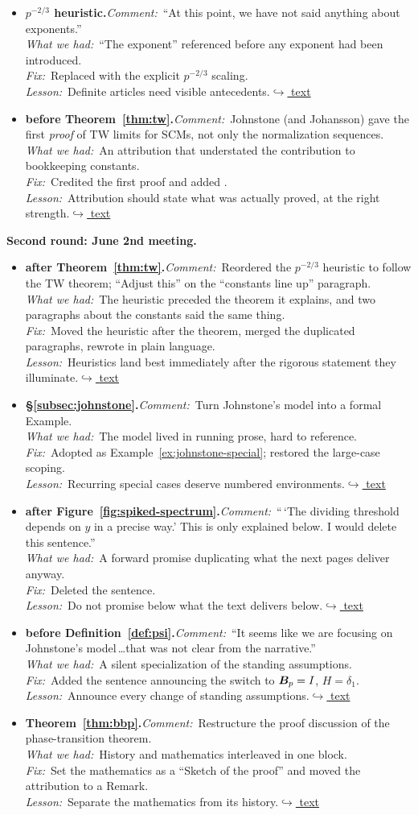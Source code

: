 \documentclass[12pt]{article}
\newcommand{\gdlogentry}[6]{%
  \item[\textcolor{thesisRev}{$\star$\,\ref{gdrev:#1}}]\hypertarget{gdlog:#1}{}%
  \textbf{#2.}\enspace\emph{Comment:}~#3\\
  \emph{What we had:}~#4\\
  \emph{Fix:}~#5\\
  \emph{Lesson:}~#6\enspace\hyperlink{gdtext:#1}{\textcolor{thesisLink}{$\hookrightarrow$ text}}}
\begin{document}
\begin{itemize}[leftmargin=2.4em,itemsep=0.55em]
\gdlogentry{exponent}{\(p^{-2/3}\) heuristic}{``At this point, we have not said anything about exponents.''}{``The exponent'' referenced before any exponent had been introduced.}{Replaced with the explicit \(p^{-2/3}\) scaling.}{Definite articles need visible antecedents.}

\gdlogentry{johnstone-attr}{before Theorem~\ref{thm:tw}}{Johnstone (and Johansson) gave the first \emph{proof} of TW limits for SCMs, not only the normalization sequences.}{An attribution that understated the contribution to bookkeeping constants.}{Credited the first proof and added \citet{Johansson2000}.}{Attribution should state what was actually proved, at the right strength.}
\end{itemize}

\medskip
\noindent\textbf{Second round: June 2nd meeting.}
\begin{itemize}[leftmargin=2.4em,itemsep=0.55em]
\gdlogentry{heuristic-reorder}{after Theorem~\ref{thm:tw}}{Reordered the \(p^{-2/3}\) heuristic to follow the TW theorem; ``Adjust this'' on the ``constants line up'' paragraph.}{The heuristic preceded the theorem it explains, and two paragraphs about the constants said the same thing.}{Moved the heuristic after the theorem, merged the duplicated paragraphs, rewrote in plain language.}{Heuristics land best immediately after the rigorous statement they illuminate.}

\gdlogentry{johnstone-example}{\S\ref{subsec:johnstone}}{Turn Johnstone's model into a formal Example.}{The model lived in running prose, hard to reference.}{Adopted as Example~\ref{ex:johnstone-special}; restored the large-case scoping.}{Recurring special cases deserve numbered environments.}

\gdlogentry{delete-threshold}{after Figure~\ref{fig:spiked-spectrum}}{``\,`The dividing threshold depends on \(y\) in a precise way.' This is only explained below. I would delete this sentence.''}{A forward promise duplicating what the next pages deliver anyway.}{Deleted the sentence.}{Do not promise below what the text delivers below.}

\gdlogentry{johnstone-focus}{before Definition~\ref{def:psi}}{``It seems like we are focusing on Johnstone's model\,\dots that was not clear from the narrative.''}{A silent specialization of the standing assumptions.}{Added the sentence announcing the switch to \(\bm{B}_p = I\), \(H = \delta_1\).}{Announce every change of standing assumptions.}

\gdlogentry{proof-sketch}{Theorem~\ref{thm:bbp}}{Restructure the proof discussion of the phase-transition theorem.}{History and mathematics interleaved in one block.}{Set the mathematics as a ``Sketch of the proof'' and moved the attribution to a Remark.}{Separate the mathematics from its history.}


\end{itemize}
\end{document}
